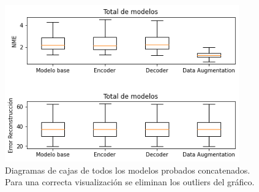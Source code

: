        \begin{figure}[H]
            \centering
            \includegraphics[width=0.9\textwidth]{img/boxplot_sumarize.png}
            \caption{Diagramas de cajas de todos los modelos probados concatenados. Para una correcta visualización se eliminan los outliers del gráfico.}
            \label{fig:boxplot_summary}
        \end{figure}

